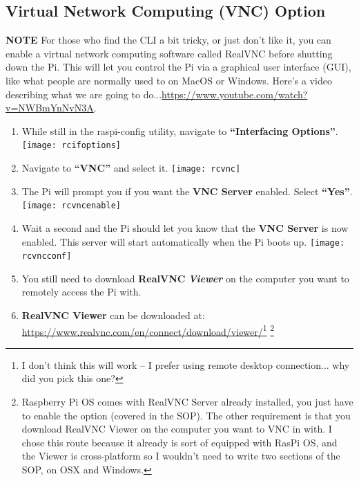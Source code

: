 \documentclass{article}
\begin{document}
\subsection{Virtual Network Computing (VNC) Option}

\textbf{NOTE} For those who find the CLI a bit tricky, or just don't like it, you can enable a virtual network computing software called RealVNC before shutting down the Pi. This will let you control the Pi via a graphical user interface (GUI), like what people are normally used to on MacOS or Windows. Here's a video describing what we are going to do...\url{https://www.youtube.com/watch?v=NWBmYnNvN3A}.

\begin{enumerate}
  \item While still in the raspi-config utility, navigate to \textbf{``Interfacing Options''}.
  \newline
  \newline
  \texttt{[image: rcifoptions]}
  \item Navigate to \textbf{``VNC''} and select it.
  \newline
  \newline
  \texttt{[image: rcvnc]}
  \item The Pi will prompt you if you want the \textbf{VNC Server} enabled. Select \textbf{``Yes''}.
  \newline
  \newline
  \texttt{[image: rcvncenable]}
  \item Wait a second and the Pi should let you know that the \textbf{VNC Server} is now enabled. This server will start automatically when the Pi boots up.
  \newline
  \newline
  \texttt{[image: rcvncconf]}
  \item You still need to download \textbf{RealVNC} \textbf{\textit{Viewer}} on the computer you want to remotely access the Pi with.
  \item \textbf{RealVNC Viewer} can be downloaded at:
  \newline
  \url{https://www.realvnc.com/en/connect/download/viewer/}\footnote{I don't think this will work -- I prefer using remote desktop connection... why did you pick this one?} \footnote{Raspberry Pi OS comes with RealVNC Server already installed, you just have to enable the option (covered in the SOP). The other requirement is that you download RealVNC Viewer on the computer you want to VNC in with. I chose this route because it already is sort of equipped with RasPi OS, and the Viewer is cross-platform so I wouldn't need to write two sections of the SOP, on OSX and Windows.}

\end{enumerate}
\end{document}
